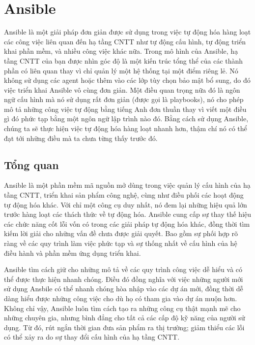 \section{Ansible}
Ansible là một giải pháp đơn giản được sử dụng trong việc tự động hóa hàng loạt các công việc liên quan đến hạ tầng CNTT như tự động cấu hình, tự động triển khai phần mềm, và nhiều công việc khác nữa. Trong mô hình của Ansible, hạ tầng CNTT của bạn được nhìn góc độ là một kiến trúc tổng thể của các thành phần có liên quan thay vì chỉ quản lý một hệ thống tại một điểm riêng lẻ. Nó không sử dụng các agent hoặc thêm vào các lớp tùy chọn bảo mật bổ sung, do đó việc triển khai Ansible vô cùng đơn giản. Một điều quan trọng nữa đó là ngôn ngữ cấu hình mà nó sử dụng rất đơn giản (được gọi là playbooks), nó cho phép mô tả những công việc tự động bằng tiếng Anh đơn thuần thay vì viết một điều gì đó phức tạp bằng một ngôn ngữ lập trình nào đó. Bằng cách sử dụng Ansible, chúng ta sẽ thực hiện việc tự động hóa hàng loạt nhanh hơn, thậm chí nó có thể đạt tới những điều mà ta chưa từng thấy trước đó.


\subsection{Tổng quan}

Ansible là một phần mềm mã nguồn mở dùng trong việc quản lý cấu hình của hạ tầng CNTT, triển khai sản phẩm công nghệ, cùng như điều phối các hoạt động tự động hóa khác. Với chỉ một công cụ duy nhất, nó đem lại những hiệu quả lớn trước hàng loạt các thách thức về tự động hóa. Ansible cung cấp sự thay thế hiệu các chức năng cốt lỗi vốn có trong các giải pháp tự động hóa khác, đồng thời tìm kiếm lời giải cho những vấn đề chưa được giải quyết. Bao gồm sự phối hợp rõ ràng về các quy trình làm việc phức tạp và sự thống nhất về cấu hình của hệ điều hành và phần mềm ứng dụng triển khai.

Ansible tìm cách giữ cho những mô tả về các quy trình công việc dễ hiểu và có thể được thực hiện nhanh chóng. Điều đó đồng nghĩa với việc những người mới sử dụng Ansbile có thể nhanh chóng hòa nhập vào các dự án mới, đồng thời dễ dàng hiểu được những công việc cho dù họ có tham gia vào dự án muộn hơn. Không chỉ vậy, Ansible luôn tìm cách tạo ra những công cụ thật mạnh mẽ cho những chuyên gia, nhưng bình đẳng cho tất cả các cấp độ kỹ năng của người sử dụng. Từ đó, rút ngắn thời gian đưa sản phẩm ra thị trường; giảm thiểu các lỗi có thể xảy ra do sự thay đổi cấu hình của hạ tầng CNTT.

